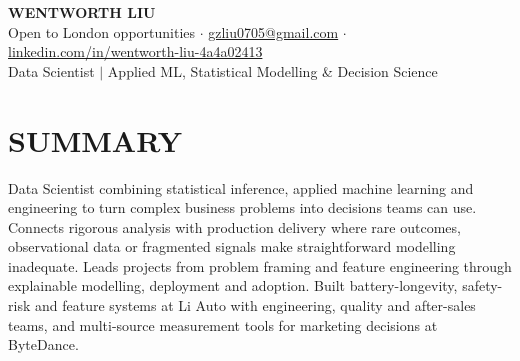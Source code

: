 \documentclass[a4paper,10pt]{article}
\begin{document}
\fontsize{9.4pt}{10.6pt}\selectfont

\begin{center}
{\Large\bfseries WENTWORTH LIU}\\[2pt]
{\small Open to London opportunities \;$\cdot$\; \href{mailto:gzliu0705@gmail.com}{gzliu0705@gmail.com} \;$\cdot$\; \href{https://www.linkedin.com/in/wentworth-liu-4a4a02413}{linkedin.com/in/wentworth-liu-4a4a02413}}\\[2pt]
{\small Data Scientist \;$\vert$\; Applied ML, Statistical Modelling \& Decision Science}
\end{center}
\vspace{-4pt}

\section{SUMMARY}
Data Scientist combining statistical inference, applied machine learning and engineering to turn complex business problems into decisions teams can use. Connects rigorous analysis with production delivery where rare outcomes, observational data or fragmented signals make straightforward modelling inadequate. Leads projects from problem framing and feature engineering through explainable modelling, deployment and adoption. Built battery-longevity, safety-risk and feature systems at Li Auto with engineering, quality and after-sales teams, and multi-source measurement tools for marketing decisions at ByteDance.
\end{document}
